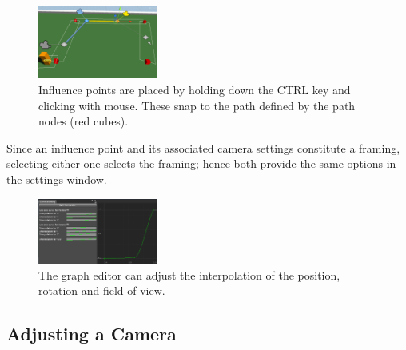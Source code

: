 \begin{figure}[htbp]
\centering
\includegraphics[width=0.35\textwidth]{Pics/placingInfluencePoint}
\caption{Influence points are placed by holding down the CTRL key and clicking with mouse. These snap to the path defined by the path nodes (red cubes).}
\label{fig:placingInfluencePoint}
\end{figure}


Since an influence point and its associated camera settings constitute a framing, selecting either one selects the framing; hence both provide the same options in the settings window.

\begin{figure}[htbp]
\centering
\includegraphics[width=0.35\textwidth]{Pics/curve}
\caption{The graph editor can adjust the interpolation of the position, rotation and field of view.}
\label{fig:curve}
\end{figure}
\subsection{Adjusting a Camera}

